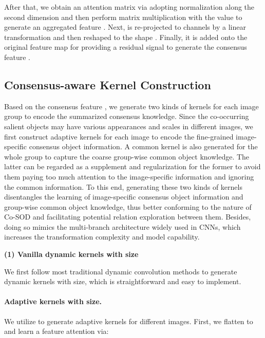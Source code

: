 \documentclass[10pt,twocolumn,letterpaper]{article}
\begin{document}
After that, we obtain an attention matrix via adopting normalization along the second dimension and then perform matrix multiplication with the value to generate an aggregated feature .
Next,  is re-projected to  channels by a linear transformation and then reshaped to the shape . Finally, it is added onto the original feature map  for providing a residual signal to generate the consensus feature .

\subsection{Consensus-aware Kernel Construction}
Based on the consensus feature , we generate two kinds of kernels for each image group to encode the summarized consensus knowledge. Since the co-occurring salient objects may have various appearances and scales in different images, we first construct adaptive kernels for each image to encode the fine-grained image-specific consensus object information. A common kernel is also generated for the whole group to capture the coarse group-wise common object knowledge. The latter can be regarded as a supplement and regularization for the former to avoid them paying too much attention to the image-specific information and ignoring the common information. To this end, generating these two kinds of kernels disentangles the learning of image-specific consensus object information and group-wise common object knowledge, thus better conforming to the nature of Co-SOD and facilitating potential relation exploration between them. Besides, doing so mimics the multi-branch architecture widely used in CNNs, which increases the transformation complexity and model capability.

\vspace{3mm}
\noindent\textbf{(1) Vanilla dynamic kernels with  size}
\vspace{2mm}

We first follow most traditional dynamic convolution methods \cite{qi2020pointins, tian2020conditional} to generate dynamic kernels with  size, which is straightforward and easy to implement.

\vspace{-3mm}
\paragraph{Adaptive kernels with  size.}
We utilize  to generate adaptive kernels for different images. First, we flatten  to  and learn a feature attention  via:
\end{document}
